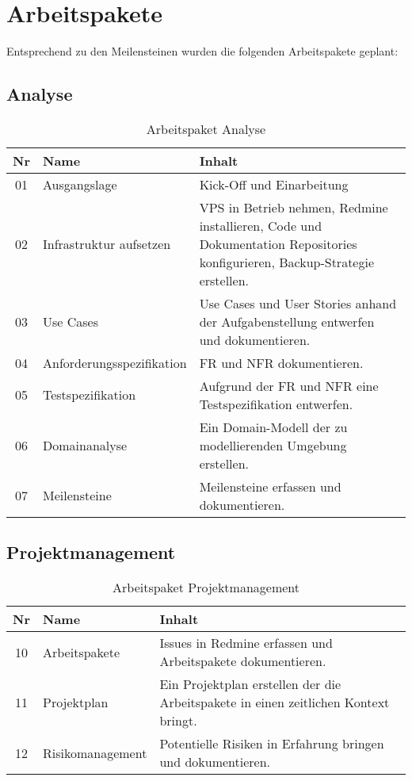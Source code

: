 \section{Arbeitspakete}
\label{sec:Arbeitspakete}

Entsprechend zu den Meilensteinen wurden die folgenden Arbeitspakete geplant:

\subsection{Analyse}
\begin{table}[H]
\begin{tabularx}{\textwidth}{ c | l | X }
\textbf{Nr} & \textbf{Name} & \textbf{Inhalt} \\ \hline
01 & Ausgangslage & Kick-Off und Einarbeitung \\ \hline
02 & Infrastruktur aufsetzen & \acs{VPS} in Betrieb nehmen, Redmine installieren, Code und Dokumentation Repositories konfigurieren, Backup-Strategie erstellen. \\ \hline
03 & Use Cases & Use Cases und User Stories anhand der Aufgabenstellung entwerfen und dokumentieren.\\ \hline
04 & Anforderungsspezifikation & \ac{FR} und \ac{NFR} dokumentieren.\\ \hline
05 & Testspezifikation & Aufgrund der \ac{FR} und \ac{NFR} eine Testspezifikation entwerfen.\\ \hline
06 & Domainanalyse & Ein Domain-Modell der zu modellierenden Umgebung erstellen.\\ \hline
07 & Meilensteine & Meilensteine erfassen und dokumentieren.\\
\end{tabularx}
\caption{Arbeitspaket Analyse}
\end{table}

\subsection{Projektmanagement}
\begin{table}[H]
\begin{tabularx}{\textwidth}{ c | l | X }
\textbf{Nr} & \textbf{Name} & \textbf{Inhalt} \\ \hline
10 & Arbeitspakete & Issues in Redmine erfassen und Arbeitspakete dokumentieren. \\ \hline
11 & Projektplan & Ein Projektplan erstellen der die Arbeitspakete in einen zeitlichen Kontext bringt.\\ \hline
12 & Risikomanagement & Potentielle Risiken in Erfahrung bringen und dokumentieren.\\
\end{tabularx}
\caption{Arbeitspaket Projektmanagement}
\end{table}


